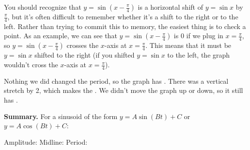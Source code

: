 \documentclass[main]{subfiles}
\begin{document}
\begin{enumerate}[resume]
\begin{enumerate}
\begin{solution}
      You should recognize that \color{red} $y = \sin \left( x -
        \frac{\pi}{4} \right)$ \color{black} is a horizontal shift of $y =
      \sin x$ by $\frac{\pi}{4}$, but it's often difficult to remember
      whether it's a shift to the right or to the left.  Rather than
      trying to commit this to memory, the easiest thing is to check a
      point.  As an example, we can see that $y = \sin \left( x -
        \frac{\pi}{4} \right)$ is 0 if we plug in $x = \frac{\pi}{4}$, so
      $y = \sin \left( x - \frac{\pi}{4} \right)$ crosses the $x$-axis at
      $x = \frac{\pi}{4}$.  This means that it must be $y = \sin x$
      shifted to the right (if you shifted $y = \sin x$ to the left, the
      graph wouldn't cross the $x$-axis at $x = \frac{\pi}{4}$). 

      \begin{center}
      \end{center}
      Nothing we did changed the period, so the graph has .  There was a vertical stretch by 2, which makes the
      .  We didn't move the graph up or down, so it
      still has . 
    \end{solution}

  \end{enumerate}

  \begin{framed}
    \textbf{Summary.} For a sinusoid of the form $y = A \sin (Bt) + C$
    or $y = A \cos (Bt) + C$:
    
    \vspace{6pt}
    Amplitude:  \hspace{0.25in}
    Midline:  \hspace{0.25in}
    Period: 
  \end{framed}

\end{enumerate}
\end{document}

